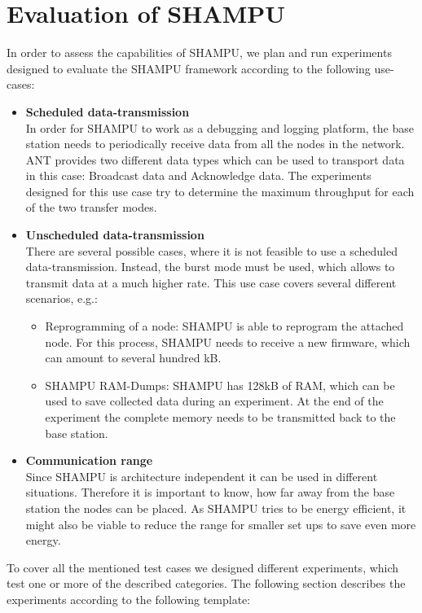 \chapter{Evaluation of SHAMPU}
In order to assess the capabilities of SHAMPU, we plan and run experiments designed to evaluate the SHAMPU framework according to the following use-cases:
\begin{itemize}
	\item{\textbf{Scheduled data-transmission}} \hfill \\ In order for SHAMPU to work as a debugging and logging platform, the base station needs to periodically receive data from all the nodes in the network. ANT provides two different data types which can be used to transport data in this case: Broadcast data and Acknowledge data. The experiments designed for this use case try to determine the maximum throughput for each of the two transfer modes.
	\item{\textbf{Unscheduled data-transmission}} \hfill \\ There are several possible cases, where it is not feasible to use a scheduled data-transmission. Instead, the burst mode must be used, which allows to transmit data at a much higher rate. This use case covers several different scenarios, e.g.:
	\begin{itemize}
		\item{}Reprogramming of a node: SHAMPU is able to reprogram the attached node. For this process, SHAMPU needs to receive a new firmware, which can amount to several hundred kB.
		\item{}SHAMPU RAM-Dumps: SHAMPU has 128kB of RAM, which can be used to save collected data during an experiment. At the end of the experiment the complete memory needs to be transmitted back to the base station.
	\end{itemize}
	\item{\textbf{Communication range}} \hfill \\ Since SHAMPU is architecture independent it can be used in different situations. Therefore it is important to know, how far away from the base station the nodes can be placed. As SHAMPU tries to be energy efficient, it might also be viable to reduce the range for smaller set ups to save even more energy.
\end{itemize}

To cover all the mentioned test cases we designed different experiments, which test one or more of the described categories. The following section describes the experiments according to the following template:

